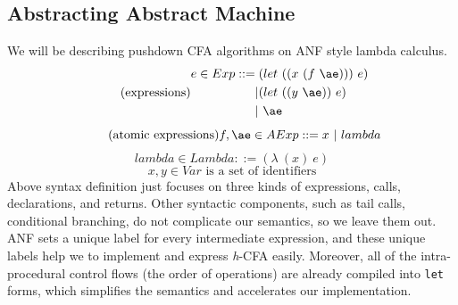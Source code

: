 \documentclass{article}
\begin{document}
\subsection{Abstracting Abstract Machine}
\label{subs:Abstracting Abstract Machine}
We will be describing pushdown CFA algorithms on ANF style lambda calculus.
\[
\tag{expressions}
\begin{aligned}
\label{eq:bnf}
e \in Exp ::= {}& (let\ ((x\ (f\ \ae)))\ e) {} \\
| & (let\ ((y\ \ae))\ e) {}\\
| & \ \ae
\end{aligned}
\]
\[
\tag{atomic expressions}
f, \ae \in AExp ::= x\ |\ lambda
\]
\[
\tag{lambda abstractions}
lambda \in Lambda ::= (\lambda\ (x)\ e)
\]
\[
\tag{variables}
x,y \in Var \mbox{ is a set of identifiers}
\]
Above syntax definition just focuses on three kinds of expressions, calls, declarations, and returns.
Other syntactic components, such as tail calls, conditional branching, do not complicate our semantics, so we leave them out.
ANF sets a unique label for every intermediate expression, and these unique labels help we to implement and express \textit{h}-CFA easily.
Moreover, all of the intra-procedural control flows (the order of operations) are already compiled into \verb|let| forms, which simplifies the semantics and accelerates our implementation.
\end{document}
